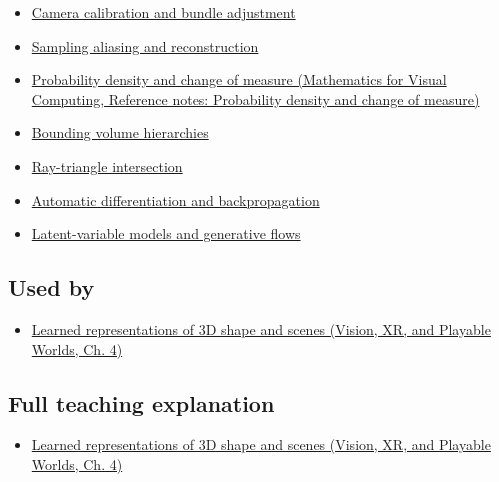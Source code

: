 \hypertarget{appendix-c5b332e400e7-prerequisites}{}

\begin{itemize}
\tightlist
\item
  \hyperref[appendix-3ee9861904d5]{Camera calibration and bundle adjustment}
\item
  \hyperref[appendix-6a7869dd79a6]{Sampling aliasing and reconstruction}
\item
  \href{../02-Mathematics-for-Visual-Computing/main.pdf\#nameddest=appendix-4815cd87ab8b}{Probability density and change of measure (Mathematics for Visual Computing, Reference notes: Probability density and change of measure)}
\item
  \hyperref[appendix-0b426c47dd78]{Bounding volume hierarchies}
\item
  \hyperref[appendix-47ac1bd6d144]{Ray-triangle intersection}
\item
  \hyperref[appendix-40df0855b4a7]{Automatic differentiation and backpropagation}
\item
  \hyperref[appendix-2c568f05ee34]{Latent-variable models and generative flows}
\end{itemize}

\subsection{Used by}\label{appendix-c5b332e400e7-used-by}

\hypertarget{appendix-c5b332e400e7-used-by}{}

\begin{itemize}
\tightlist
\item
  \href{../07-Vision-XR-and-Playable-Worlds/main.pdf\#nameddest=04-visual-computing-ii-ch034-learned-representations-of-3d-shape-and-scenes}{Learned representations of 3D shape and scenes (Vision, XR, and Playable Worlds, Ch. 4)}
\end{itemize}

\subsection{Full teaching explanation}\label{appendix-c5b332e400e7-full-teaching-explanation}

\hypertarget{appendix-c5b332e400e7-full-teaching-explanation}{}

\begin{itemize}
\tightlist
\item
  \href{../07-Vision-XR-and-Playable-Worlds/main.pdf\#nameddest=04-visual-computing-ii-ch034-learned-representations-of-3d-shape-and-scenes}{Learned representations of 3D shape and scenes (Vision, XR, and Playable Worlds, Ch. 4)}
\end{itemize}

